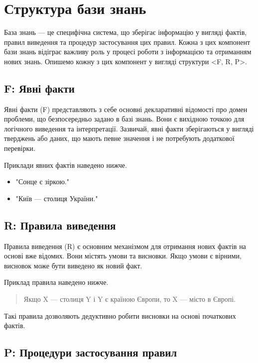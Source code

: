 \documentclass[12pt, a4paper]{article}
\begin{document}
\section{Структура бази знань}

База знань — це специфічна система, що зберігає інформацію у вигляді фактів, правил виведення та процедур застосування цих правил. Кожна з цих компонент бази знань відіграє важливу роль у процесі роботи з інформацією та отриманням нових знань. Опишемо кожну з цих компонент у вигляді структури <F, R, P>.

\subsection{F: Явні факти}

Явні факти (F) представляють з себе основні декларативні відомості про домен проблеми, що безпосередньо задано в базі знань. Вони є вихідною точкою для логічного виведення та інтерпретації. Зазвичай, явні факти зберігаються у вигляді тверджень або даних, що мають певне значення і не потребують додаткової перевірки.

Приклади явних фактів наведено нижче.

\begin{itemize}
    \item "Сонце є зіркою."
    \item "Київ — столиця України."
\end{itemize}

\subsection{R: Правила виведення}

Правила виведення (R) є основним механізмом для отримання нових фактів на основі вже відомих. Вони містять умови та висновки. Якщо умови є вірними, висновок може бути виведено як новий факт.

Приклад правила наведено нижче.

\begin{quote}
    Якщо X — столиця Y і Y є країною Європи, то X — місто в Європі.
\end{quote}

Такі правила дозволяють дедуктивно робити висновки на основі початкових фактів.

\subsection{P: Процедури застосування правил}
\end{document}
